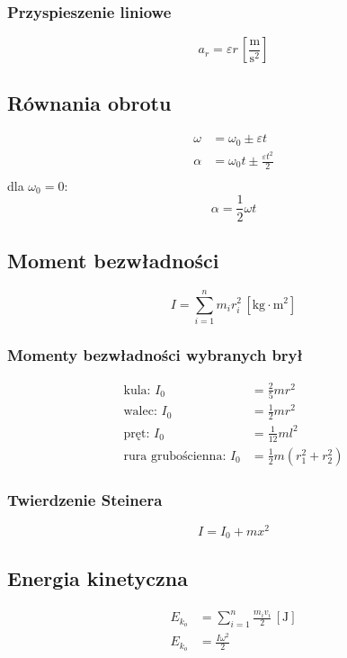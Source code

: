 \documentclass{article}
\numberwithin{equation}{section}
\newcommand{\unit}[1]{\, \left[\mathrm{#1}\right]}
\begin{document}
      \subsubsection{Przyspieszenie liniowe}
        \begin{equation}
          a_r = \varepsilon r \unit{\frac{m}{s^2}}
        \end{equation}
      \subsection{Równania obrotu}
        \begin{align}
          \omega &= \omega_0 \pm \varepsilon t\\
          \alpha &= \omega_0t \pm \frac{\varepsilon t^2}{2}\\
        \end{align}
        dla $\omega_0 = 0$:
        \begin{equation}
          \alpha = \frac{1}{2} \omega t
        \end{equation}
    \subsection{Moment bezwładności}
      \begin{equation}
        I = \sum_{i=1}^n m_ir_i^2 \unit{kg\cdot m^2}
      \end{equation}
      \subsubsection{Momenty bezwładności wybranych brył}
        \begin{align}
          \text{kula: } I_0 &= \frac{2}{5}mr^2\\
          \text{walec: } I_0 &= \frac{1}{2}mr^2\\
          \text{pręt: } I_0 &= \frac{1}{12}ml^2\\
          \text{rura grubościenna: } I_0 &= \frac{1}{2}m(r_1^2 + r_2^2)
        \end{align}
      \subsubsection{Twierdzenie Steinera}
        \begin{equation}
          I = I_0 +mx^2
        \end{equation}
    \subsection{Energia kinetyczna}
      \begin{align}
        E_{k_o} &= \sum_{i=1}^n \frac{m_iv_i}{2} \unit{J}\\
        E_{k_o} &= \frac{I\omega^2}{2}
      \end{align}
\end{document}
